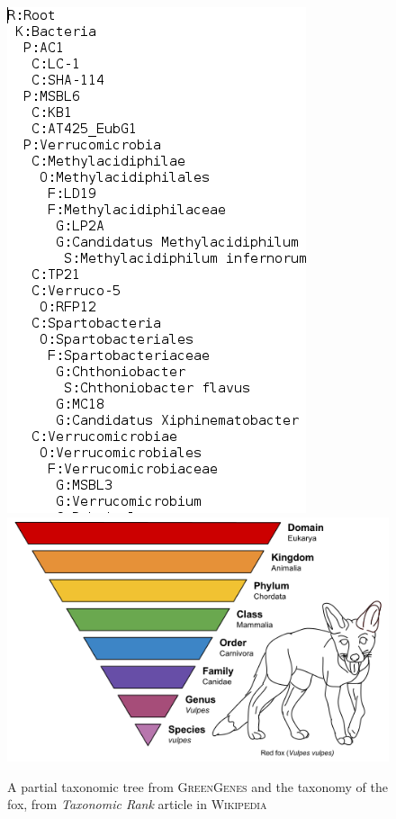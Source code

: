 \documentclass{report}
\begin{document}
\begin{figure}[H]
\begin{center}
\subfigure\includegraphics[scale=0.30]{illustrations/arbretaxo.png}
\subfigure\includegraphics[scale=0.30]{illustrations/Taxonomic_Rank.png}
\caption{A partial taxonomic tree from \textsc{GreenGenes} and the taxonomy of the fox, from \emph{Taxonomic Rank} article in \textsc{Wikipedia}}
\end{center}
\end{figure}
\end{document}
